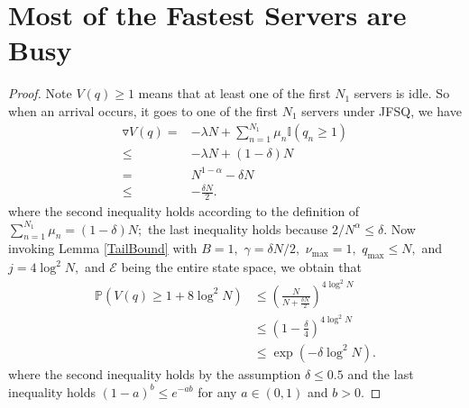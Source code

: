 \documentclass[11pt,oneside,letter]{article}
\begin{document}
\section{Most of the Fastest Servers are Busy}
\mostnone*
\begin{proof}
Note $V(q)\geq 1$ means that at least one of the first $N_1$ servers is idle.  So when an arrival occurs, it goes to one of the first $N_1$ servers under JFSQ, we have
\begin{align*}
\triangledown V(q) = & -\lambda N +\sum_{n=1}^{N_1}\mu_n \mathbb{I}(q_n\geq 1)\\
\leq & -\lambda N + (1-\delta) N\\
= & N^{1-\alpha}-\delta N\\
\leq & -\frac{\delta N}{2}.
\end{align*}
where the second inequality holds according to the definition of $\sum_{n=1}^{N_1} \mu_n = (1-\delta)N;$ the last inequality holds because $2/N^\alpha\leq \delta.$ Now invoking Lemma \ref{TailBound} with $B=1,$ $\gamma= {\delta N}/{2},$ $\nu_{\max}=1,$ $q_{\max}\leq N,$ and $j=4\log^2 N,$ and $\mathcal E$ being the entire state space, we obtain that 
\begin{align*}
  \mathbb P\left(V(q)\geq 1+ 8\log^2 N \right)&\leq \left(\frac{N}{N+\frac{\delta N}{2}}\right)^{4\log^2 N}\\ 
   &\leq \left(1- \frac{\delta}{4}\right)^{ 4\log^2 N}\\
   &\leq \exp\left(- \delta \log^2 N\right).
\end{align*}
where the second inequality holds by the assumption $\delta \leq 0.5$ and the last inequality holds $(1-a)^b\leq e^{-ab}$ for any $a\in (0,1)$ and $b>0.$
\end{proof}
\end{document}
